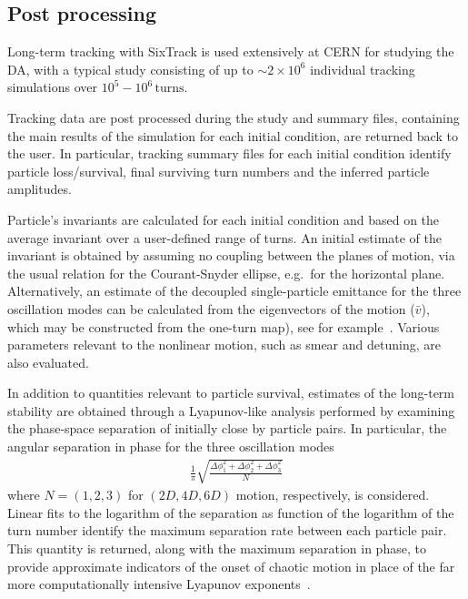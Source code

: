 \documentclass[a4paper,
              ]{jacow}
\begin{document}
\subsection{Post processing}

Long-term tracking with SixTrack is used extensively at CERN for studying the DA, with a typical study consisting of up to $\sim 2\times 10^{6}$ individual tracking simulations over $10^5-10^6\,\mathrm{turns}$.

Tracking data are post processed during the study and summary files, containing the main results of the simulation for each initial condition, are returned back to the user. In particular, tracking summary files for each initial condition identify particle loss/survival, final surviving turn numbers and the inferred particle amplitudes.

Particle's invariants are calculated for each initial condition and based on the average invariant over a user-defined range of turns.
An initial estimate of the invariant is obtained by assuming no coupling between the planes of motion, via the usual relation for the Courant-Snyder ellipse, e.g.\ for the horizontal plane.
Alternatively, an estimate of the decoupled single-particle emittance for the three oscillation modes can be calculated from the eigenvectors of the motion ($\bar{v}$), which may be constructed from the one-turn map), see for example~\cite{maisripken}. Various parameters relevant to the nonlinear motion, such as smear and detuning, are also evaluated.

In addition to quantities relevant to particle survival, estimates of the long-term stability are obtained through a Lyapunov-like analysis performed by examining the phase-space separation of initially close by particle pairs. In particular, the angular separation in phase for the three oscillation modes
\begin{align}
&\frac{1}{\pi}\sqrt{\frac{ \Delta\phi_{1}^2 + \Delta\phi_{2}^2 + \Delta\phi_{3}^2 }{N}}&\nonumber
\end{align}
where $N=(1,2,3)$ for $(2D,4D,6D)$ motion, respectively, is considered. Linear fits to the logarithm of the separation as function of the logarithm of the turn number identify the maximum separation rate between each particle pair. This quantity is returned, along with the maximum separation in phase, to provide approximate indicators of the onset of chaotic motion in place of the far more computationally intensive Lyapunov exponents~\cite{chaosproxy,distanceslope}.
\end{document}
